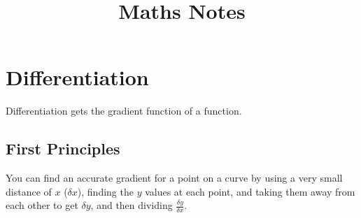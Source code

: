 \documentclass[a4paper, 12pt]{article}
\title{Maths Notes}
\date{}
\begin{document}
\maketitle

\section{Differentiation}

Differentiation gets the gradient function of a function.

\subsection{First Principles}

You can find an accurate gradient for a point on a curve by using a very small distance of $x$ (${\delta}x$), finding the $y$ values at each point, and taking them away from each other to get ${\delta}y$, and then dividing $\frac{\delta y}{\delta x}$.
\end{document}
